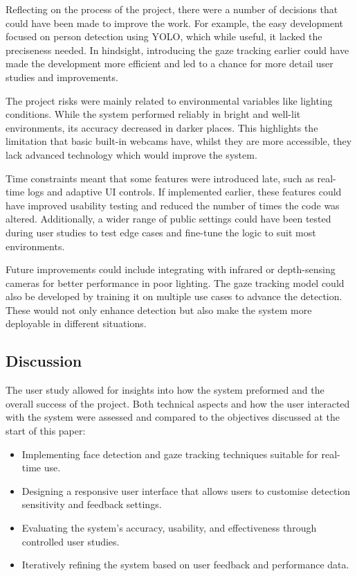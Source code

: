 \documentclass[12pt]{article}
\theoremstyle{plain}
\theoremstyle{definition}
\begin{document}
Reflecting on the process of the project, there were a number of decisions that could have been made to improve the work. For example, the easy development focused on person detection using YOLO, which while useful, it lacked the preciseness needed. In hindsight, introducing the gaze tracking earlier could have made the development more efficient and led to a chance for more detail user studies and improvements.

The project risks were mainly related to environmental variables like lighting conditions. While the system performed reliably in bright and well-lit environments, its accuracy decreased in darker places. This highlights the limitation that basic built-in webcams have, whilst they are more accessible, they lack advanced technology which would improve the system.

Time constraints meant that some features were introduced late, such as real-time logs and adaptive UI controls. If implemented earlier, these features could have improved usability testing and reduced the number of times the code was altered. Additionally, a wider range of public settings could have been tested during user studies to test edge cases and fine-tune the logic to suit most environments.

Future improvements could include integrating with infrared or depth-sensing cameras for better performance in poor lighting. The gaze tracking model could also be developed by training it on multiple use cases to advance the detection. These would not only enhance detection but also make the system more deployable in different situations.

\subsection{Discussion}
\label{discussion}

The user study allowed for insights into how the system preformed and the overall success of the project. Both technical aspects and how the user interacted with the system were assessed and compared to the objectives discussed at the start of this paper:

\begin{itemize}
  \item Implementing face detection and gaze tracking techniques suitable for real-time use.
  \item Designing a responsive user interface that allows users to customise detection sensitivity and feedback settings.
  \item Evaluating the system’s accuracy, usability, and effectiveness through controlled user studies.
  \item Iteratively refining the system based on user feedback and performance data.
\end{itemize}
\end{document}
